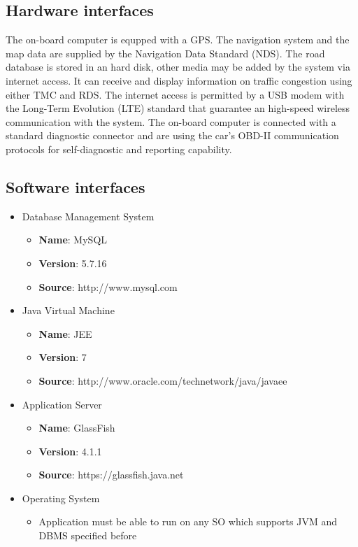 \subsection{Hardware interfaces}
The on-board computer is equpped with a GPS. The  navigation system and the map data are supplied by the Navigation Data Standard (NDS). The road database is stored in an hard disk, other media may be added by the system via internet access. It can receive and display information on traffic congestion using either TMC and RDS.
The internet access is permitted by a USB modem with the Long-Term Evolution (LTE) standard that guarantee an high-speed wireless communication with the system.
The on-board computer is connected with a standard diagnostic connector and are using the car's OBD-II communication protocols for self-diagnostic and reporting capability.

\blindtext
\subsection{Software interfaces}
\begin{itemize}
	\item{Database Management System
		\begin{itemize}
			\item{{\bf Name}: MySQL}
			\item{{\bf Version}: 5.7.16}
			\item{{\bf Source}: http://www.mysql.com}
		\end{itemize}
	}
	\item{Java Virtual Machine
		\begin{itemize}
			\item{{\bf Name}: JEE}
			\item{{\bf Version}: 7}
			\item{{\bf Source}: http://www.oracle.com/technetwork/java/javaee}
		\end{itemize}
	}
	\item{Application Server
		\begin{itemize}
			\item{{\bf Name}: GlassFish}
			\item{{\bf Version}: 4.1.1}
			\item{{\bf Source}: https://glassfish.java.net}
		\end{itemize}
	}
	\item{Operating System
		\begin{itemize}
			\item{Application must be able to run on any SO which supports JVM and
				  DBMS specified before}
		\end{itemize}
	}

\end{itemize}

